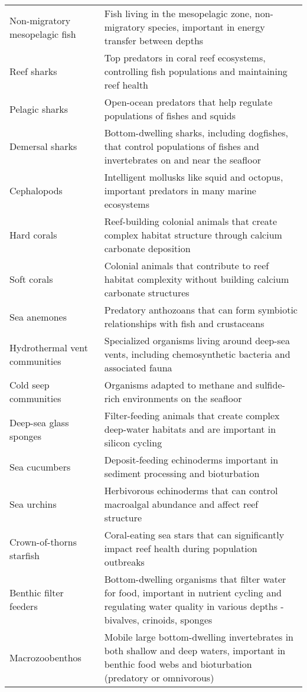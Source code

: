 \begin{longtable}{p{}p{}}
Non-migratory mesopelagic fish & Fish living in the mesopelagic zone, non-migratory species, important in energy transfer between depths \\
Reef sharks & Top predators in coral reef ecosystems, controlling fish populations and maintaining reef health \\
Pelagic sharks & Open-ocean predators that help regulate populations of fishes and squids \\
Demersal sharks & Bottom-dwelling sharks, including dogfishes, that control populations of fishes and invertebrates on and near the seafloor \\
Cephalopods & Intelligent mollusks like squid and octopus, important predators in many marine ecosystems \\
Hard corals & Reef-building colonial animals that create complex habitat structure through calcium carbonate deposition \\
Soft corals & Colonial animals that contribute to reef habitat complexity without building calcium carbonate structures \\
Sea anemones & Predatory anthozoans that can form symbiotic relationships with fish and crustaceans \\
Hydrothermal vent communities & Specialized organisms living around deep-sea vents, including chemosynthetic bacteria and associated fauna \\
Cold seep communities & Organisms adapted to methane and sulfide-rich environments on the seafloor \\
Deep-sea glass sponges & Filter-feeding animals that create complex deep-water habitats and are important in silicon cycling \\
Sea cucumbers & Deposit-feeding echinoderms important in sediment processing and bioturbation \\
Sea urchins & Herbivorous echinoderms that can control macroalgal abundance and affect reef structure \\
Crown-of-thorns starfish & Coral-eating sea stars that can significantly impact reef health during population outbreaks \\
Benthic filter feeders & Bottom-dwelling organisms that filter water for food, important in nutrient cycling and regulating water quality in various depths - bivalves, crinoids, sponges \\
Macrozoobenthos & Mobile large bottom-dwelling invertebrates in both shallow and deep waters, important in benthic food webs and bioturbation (predatory or omnivorous) \\

\end{longtable}
